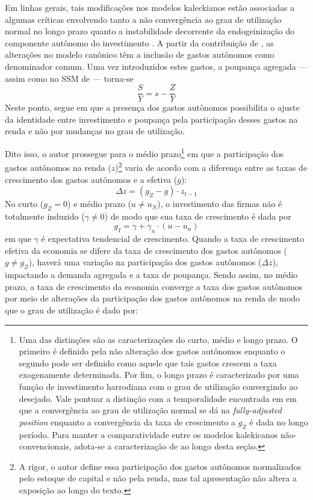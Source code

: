 Em linhas gerais, tais modificações nos modelos kaleckianos estão associadas a algumas críticas envolvendo tanto a não convergência ao grau de utilização normal no longo prazo quanto a instabilidade decorrente da endogeinização do componente autônomo do investimento \cites{dallery_kaleckian_2007}{skott_theoretical_2012}{hein_harrodian_2012}.
A partir da contribuição de \textcite{allain_tackling_2015}, as alterações no modelo canônico têm a inclusão de gastos autônomos como denominador comum.
Uma vez introduzidos estes gastos, a poupança agregada --- assim como no SSM de \textcite{serrano_sraffian_1995} --- torna-se
$$
\frac{S}{Y} = s - \frac{Z}{Y}
$$
Neste ponto, \textcite[p.~10]{allain_tackling_2015} segue \textcite{serrano_sraffian_1995} em que a presença dos gastos autônomos possibilita o ajuste da identidade entre investimento e poupança pela participação desses gastos na renda e não por mudanças no grau de utilização. 

Dito isso, o autor prossegue para o médio prazo\footnote{
	Uma das distinções \textcite{allain_tackling_2015} são as caracterizações do curto, médio e longo prazo. O primeiro é definido pela não alteração dos gastos autônomos enquanto o segundo pode ser definido como aquele que tais gastos crescem a taxa exogenamente determinada. Por fim, o longo prazo é caracterizado por uma função de investimento harrodiana com o grau de utilização convergindo ao desejado. Vale pontuar a distinção com a temporalidade encontrada em \textcite{freitas_growth_2015} em que a convergência ao grau de utilização normal se dá na \textit{fully-adjusted position} enquanto a convergência da taxa de crescimento a $g_Z$ é dada no longo período. Para manter a comparatividade entre os modelos kalekicanos não-convencionais, adota-se a caracterização de \textcite{allain_tackling_2015} ao longo desta seção.
} em que a participação dos gastos autônomos na renda ($z$)\footnote{A rigor, o autor define essa participação dos gastos autônomos normalizados pelo estoque de capital e não pela renda, mas tal apresentação não altera a exposição ao longo do texto.} varia de acordo com a diferença entre as taxas de crescimento dos gastos autônomos e a efetiva ($g$):
\begin{equation}
\Delta z = (g_Z - g)\cdot z_{t-1}
\end{equation}
No curto ($g_Z = 0$) e médio prazo ($u \neq u_N$), o investimento das firmas não é totalmente induzido ($\gamma \neq 0$) de modo que sua taxa de crescimento é dada por
$$
g_I = \gamma + \gamma_u\cdot (u - u_n)
$$
em que $\gamma$ é expectativa tendencial de crescimento.
Quando a taxa de crescimento efetiva da economia se difere da taxa de crescimento dos gastos autônomos ($g\neq g_Z$),  haverá uma variação na participação dos gastos autônomos ($\Delta z$), impactando a demanda agregada e a taxa de poupança. 
Sendo assim, no médio prazo, a taxa de crescimento da economia converge a taxa dos gastos autônomos por meio de alterações da participação dos gastos autônomos na renda de modo que o grau de utilização é dado por:

